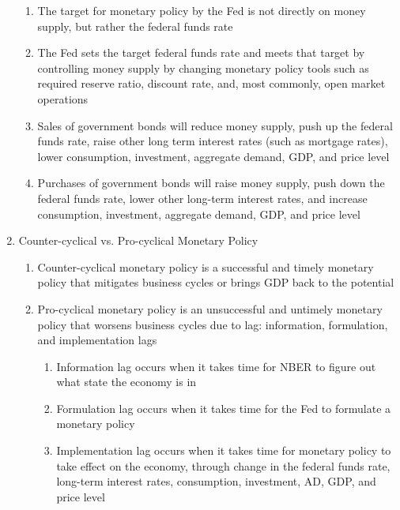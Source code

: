 \documentclass[12pt]{article}
\begin{document}
\begin{enumerate}
\begin{enumerate}
          \item The target for monetary policy by the Fed is not directly on money supply, but rather the federal funds rate

          \item The Fed sets the target federal funds rate and meets that target by controlling money supply by changing monetary policy tools such as required reserve ratio, discount rate, and, most commonly, open market operations

          \item Sales of government bonds will reduce money supply, push up the federal funds rate, raise other long term interest rates (such as mortgage rates), lower consumption, investment, aggregate demand, GDP, and price level

          \item Purchases of government bonds will raise money supply, push down the federal funds rate, lower other long-term interest rates, and increase consumption, investment, aggregate demand, GDP, and price level

        \end{enumerate}

      \item Counter-cyclical vs. Pro-cyclical Monetary Policy

        \begin{enumerate}

          \item Counter-cyclical monetary policy is a successful and timely monetary policy that mitigates business cycles or brings GDP back to the potential

          \item Pro-cyclical monetary policy is an unsuccessful and untimely monetary policy that worsens business cycles due to lag: information, formulation, and implementation lags

            \begin{enumerate}

              \item Information lag occurs when it takes time for NBER to figure out what state the economy is in

              \item Formulation lag occurs when it takes time for the Fed to formulate a monetary policy

              \item Implementation lag occurs when it takes time for monetary policy to take effect on the economy, through change in the federal funds rate, long-term interest rates, consumption, investment, AD, GDP, and price level


\end{enumerate}
\end{enumerate}
\end{enumerate}
\end{document}
